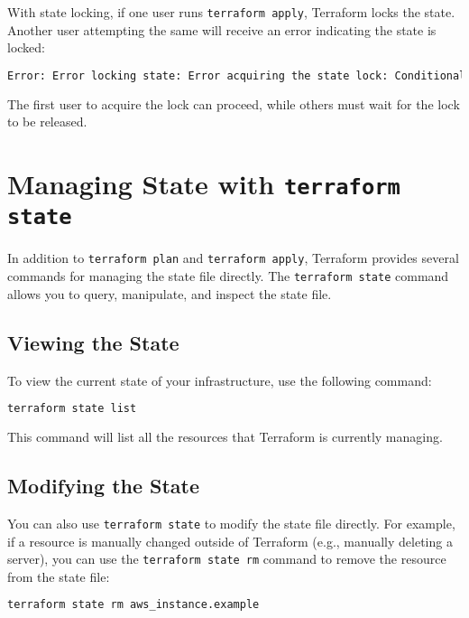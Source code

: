 With state locking, if one user runs \texttt{terraform apply}, Terraform locks the state. Another user attempting the same will receive an error indicating the state is locked:

\begin{lstlisting}[language=bash]
Error: Error locking state: Error acquiring the state lock: ConditionalCheckFailedException: The conditional request failed
\end{lstlisting}

The first user to acquire the lock can proceed, while others must wait for the lock to be released.

\section{Managing State with \texttt{terraform state}}

In addition to \texttt{terraform plan} and \texttt{terraform apply}, Terraform provides several commands for managing the state file directly. The \texttt{terraform state} command allows you to query, manipulate, and inspect the state file.

\subsection{Viewing the State}

To view the current state of your infrastructure, use the following command:

\begin{lstlisting}[language=bash]
terraform state list
\end{lstlisting}

This command will list all the resources that Terraform is currently managing.

\subsection{Modifying the State}

You can also use \texttt{terraform state} to modify the state file directly. For example, if a resource is manually changed outside of Terraform (e.g., manually deleting a server), you can use the \texttt{terraform state rm} command to remove the resource from the state file:

\begin{lstlisting}[language=bash]
terraform state rm aws_instance.example
\end{lstlisting}

